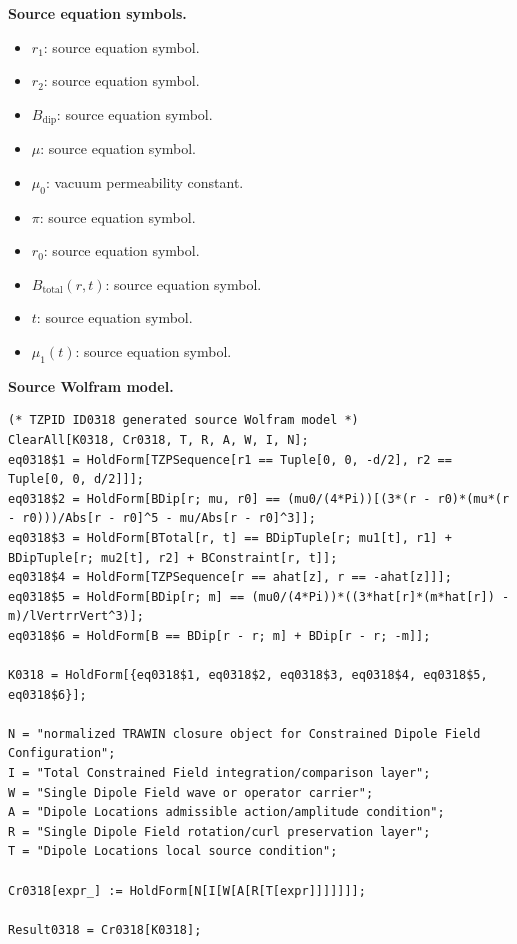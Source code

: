 \begin{minipage}[t]{0.49\linewidth}
\begingroup
\small
\raggedright
\textbf{Source equation symbols.}\par
\begin{itemize}[leftmargin=1.35em,itemsep=1pt,topsep=1pt,parsep=0pt]
    \item $r_{1}$: source equation symbol.
    \item $r_{2}$: source equation symbol.
    \item $B_{\mathrm{dip}}$: source equation symbol.
    \item $\mu$: source equation symbol.
    \item $\mu_{0}$: vacuum permeability constant.
    \item $\pi$: source equation symbol.
    \item $r_{0}$: source equation symbol.
    \item $B_{\mathrm{total}}(r,t)$: source equation symbol.
    \item $t$: source equation symbol.
    \item $\mu_{1}(t)$: source equation symbol.
\end{itemize}
\endgroup
\end{minipage}\hfill
\begin{minipage}[t]{0.47\linewidth}
\begingroup
\scriptsize
\raggedright
\textbf{Source Wolfram model.}\par
\begin{Verbatim}[fontsize=\tiny,breaklines=true,breakanywhere=true]
(* TZPID ID0318 generated source Wolfram model *)
ClearAll[K0318, Cr0318, T, R, A, W, I, N];
eq0318$1 = HoldForm[TZPSequence[r1 == Tuple[0, 0, -d/2], r2 == Tuple[0, 0, d/2]]];
eq0318$2 = HoldForm[BDip[r; mu, r0] == (mu0/(4*Pi))[(3*(r - r0)*(mu*(r - r0)))/Abs[r - r0]^5 - mu/Abs[r - r0]^3]];
eq0318$3 = HoldForm[BTotal[r, t] == BDipTuple[r; mu1[t], r1] + BDipTuple[r; mu2[t], r2] + BConstraint[r, t]];
eq0318$4 = HoldForm[TZPSequence[r == ahat[z], r == -ahat[z]]];
eq0318$5 = HoldForm[BDip[r; m] == (mu0/(4*Pi))*((3*hat[r]*(m*hat[r]) - m)/lVertrrVert^3)];
eq0318$6 = HoldForm[B == BDip[r - r; m] + BDip[r - r; -m]];

K0318 = HoldForm[{eq0318$1, eq0318$2, eq0318$3, eq0318$4, eq0318$5, eq0318$6}];

N = "normalized TRAWIN closure object for Constrained Dipole Field Configuration";
I = "Total Constrained Field integration/comparison layer";
W = "Single Dipole Field wave or operator carrier";
A = "Dipole Locations admissible action/amplitude condition";
R = "Single Dipole Field rotation/curl preservation layer";
T = "Dipole Locations local source condition";

Cr0318[expr_] := HoldForm[N[I[W[A[R[T[expr]]]]]]];

Result0318 = Cr0318[K0318];
\end{Verbatim}
\endgroup
\end{minipage}

